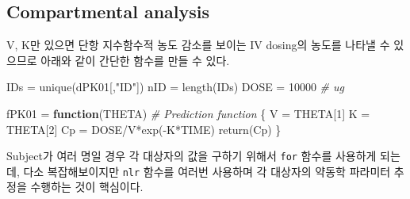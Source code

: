 \documentclass[
  11pt,
  krantz2, a4paper, twoside]{krantz}
\newenvironment{Shaded}{\begin{snugshade}}{\end{snugshade}}
\newcommand{\CommentTok}[1]{\textcolor[rgb]{0.56,0.35,0.01}{\textit{#1}}}
\newcommand{\ControlFlowTok}[1]{\textcolor[rgb]{0.13,0.29,0.53}{\textbf{#1}}}
\newcommand{\DecValTok}[1]{\textcolor[rgb]{0.00,0.00,0.81}{#1}}
\newcommand{\FunctionTok}[1]{\textcolor[rgb]{0.00,0.00,0.00}{#1}}
\newcommand{\NormalTok}[1]{#1}
\newcommand{\OtherTok}[1]{\textcolor[rgb]{0.56,0.35,0.01}{#1}}
\newcommand{\SpecialCharTok}[1]{\textcolor[rgb]{0.00,0.00,0.00}{#1}}
\newcommand{\StringTok}[1]{\textcolor[rgb]{0.31,0.60,0.02}{#1}}
\theoremstyle{definition}
\theoremstyle{definition}
\theoremstyle{definition}
\theoremstyle{definition}
\theoremstyle{remark}
\begin{document}
\hypertarget{compartmental-analysis}{%
\subsection{Compartmental analysis}\label{compartmental-analysis}}

V, K만 있으면 단항 지수함수적 농도 감소를 보이는 IV dosing의 농도를 나타낼 수 있으므로 아래와 같이 간단한 함수를 만들 수 있다.

\begin{Shaded}
\begin{Highlighting}[]
\NormalTok{IDs }\OtherTok{=} \FunctionTok{unique}\NormalTok{(dPK01[,}\StringTok{"ID"}\NormalTok{])}
\NormalTok{nID }\OtherTok{=} \FunctionTok{length}\NormalTok{(IDs)}
\NormalTok{DOSE }\OtherTok{=} \DecValTok{10000} \CommentTok{\# ug}

\NormalTok{fPK01 }\OtherTok{=} \ControlFlowTok{function}\NormalTok{(THETA) }\CommentTok{\# Prediction function}
\NormalTok{\{}
\NormalTok{  V  }\OtherTok{=}\NormalTok{ THETA[}\DecValTok{1}\NormalTok{]}
\NormalTok{  K  }\OtherTok{=}\NormalTok{ THETA[}\DecValTok{2}\NormalTok{]}
\NormalTok{  Cp }\OtherTok{=}\NormalTok{ DOSE}\SpecialCharTok{/}\NormalTok{V}\SpecialCharTok{*}\FunctionTok{exp}\NormalTok{(}\SpecialCharTok{{-}}\NormalTok{K}\SpecialCharTok{*}\NormalTok{TIME)  }
  \FunctionTok{return}\NormalTok{(Cp)}
\NormalTok{\}}
\end{Highlighting}
\end{Shaded}

Subject가 여러 명일 경우 각 대상자의 값을 구하기 위해서 \texttt{for} 함수를 사용하게 되는데, 다소 복잡해보이지만 \texttt{nlr} 함수를 여러번 사용하며 각 대상자의 약동학 파라미터 추정을 수행하는 것이 핵심이다.
\end{document}
